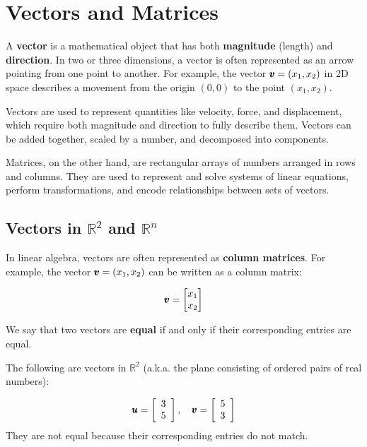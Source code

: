 \chapter{Vectors and Matrices}\label{chap:ch8}
A \textbf{vector} is a mathematical object that has both \textbf{magnitude} (length) and \textbf{direction}. In two or three dimensions, a vector is often represented as an arrow pointing from one point to another. For example, the vector \(\pmb{v} = (x_1, x_2)\) in 2D space describes a movement from the origin \((0,0)\) to the point \((x_1, x_2)\).

Vectors are used to represent quantities like velocity, force, and displacement, which require both magnitude and direction to fully describe them. Vectors can be added together, scaled by a number, and decomposed into components.

Matrices, on the other hand, are rectangular arrays of numbers arranged in rows and columns. They are used to represent and solve systems of linear equations, perform transformations, and encode relationships between sets of vectors.

\section{Vectors in \texorpdfstring{$\mathbb{R}^2$}{R2} and \texorpdfstring{$\mathbb{R}^n$}{Rn}}

In linear algebra, vectors are often represented as \textbf{column matrices}. For example, the vector \(\pmb{v} = (x_1, x_2)\) can be written as a column matrix:

\[ \pmb{v} = \begin{bmatrix} x_1 \\ x_2 \end{bmatrix} \]

We say that two vectors are \textbf{equal} if and only if their corresponding entries are equal.

\begin{example}
    The following are vectors in $\mathbb{R}^2$ (a.k.a. the plane consisting of ordered pairs of real numbers):

    \[
    \pmb{u}=\left[\begin{array}{l}
    3 \\
    5
    \end{array}\right], \quad \pmb{v}=\left[\begin{array}{l}
    5 \\
    3
    \end{array}\right]
    \]
    They are not equal because their corresponding entries do not match.
\end{example}


